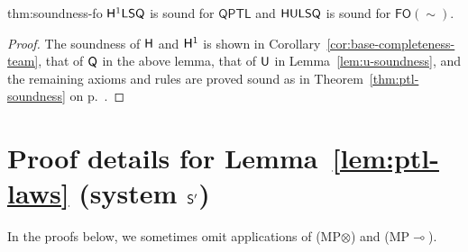 \documentclass[a4paper,english,fleqn,11pt,final]{scrartcl}
\newcommand{\negg}{{\sim}}
\newcommand{\logic}[1]{\ensuremath{\mathsf{#1}}\xspace}
\newcommand{\FO}{\logic{FO}}
\newcommand{\QPTL}{\logic{QPTL}}
\newcommand{\sfS}{\protect\ensuremath{\mathsf{S}}}
\newcommand{\sfH}{\protect\ensuremath{\mathsf{H}}}
\newcommand{\sfL}{\protect\ensuremath{\mathsf{L}}}
\newcommand{\sfQ}{\protect\ensuremath{\mathsf{Q}}}
\newcommand{\sfU}{\protect\ensuremath{\mathsf{U}}}
\newcommand{\limp}{\multimap}
\newcommand{\tens}{\otimes}
\newcommand{\Deriv}[1]{{\normalfont\textsf{#1}}}
\theoremstyle{plain}
\theoremstyle{definition}
\newcommand{\thm}{\text{\scriptsize\; (thm)}}
\begin{document}
\begin{reptheorem}{thm:soundness-fo}
$\sfH^1\sfL\sfS\sfQ$ is sound for $\QPTL$ and $\sfH\sfU\sfL\sfS\sfQ$ is sound for $\FO(\negg)$.
\end{reptheorem}
\begin{proof}
The soundness of $\sfH$ and $\sfH^1$ is shown in Corollary~\ref{cor:base-completeness-team}, that of $\sfQ$ in the above lemma, that of $\sfU$ in Lemma~\ref{lem:u-soundness}, and the remaining axioms and rules are proved sound as in Theorem~\ref{thm:ptl-soundness} on p.~\pageref{p:soundproof}.
\end{proof}
 



\section{Proof details for Lemma~\ref{lem:ptl-laws} (system $\sfS'$)}

In the proofs below, we sometimes omit applications of \Deriv{(MP$\tens$)} and \Deriv{(MP$\limp$)}.


\renewcommand{\thm}{\text{\tiny\; (thm)}}
\end{document}
